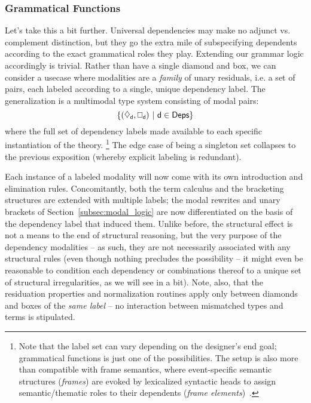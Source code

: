 \subsubsection{Grammatical Functions}
Let's take this a bit further.
Universal dependencies may make no adjunct vs. complement distinction, but they go the extra mile of subspecifying dependents according to the exact grammatical roles they play.
Extending our grammar logic accordingly is trivial.
Rather than have a single diamond and box, we can consider a usecase where modalities are a \textit{family} of unary residuals, i.e. a set of pairs, each labeled according to a single, unique dependency label.
The generalization is a multimodal type system consisting of modal pairs:
\begin{equation}
\{(\ddia{d}, \dbox{d}) \ | \ {\dep{d} \in \deps} \} 
\end{equation}
where \deps{} the full set of dependency labels made available to each specific instantiation of the theory.%
\footnote{Note that the label set can vary depending on the designer's end goal; grammatical functions is just one of the possibilities.
	The setup is also more than compatible with frame semantics, where event-specific semantic structures (\textit{frames}) are evoked by lexicalized syntactic heads to assign semantic/thematic roles to their dependents (\textit{frame elements})~\cite{fillmore1976frame}.}%
The edge case of \deps{} being a singleton set collapses to the previous exposition (whereby explicit labeling is redundant).

Each instance of a labeled modality will now come with its own introduction and elimination rules.
Concomitantly, both the term calculus and the bracketing structures are extended with multiple labels; the modal rewrites and unary brackets of Section~\ref{subsec:modal_logic} are now differentiated on the basis of the dependency label that induced them.
Unlike before, the structural effect is not a means to the end of structural reasoning, but the very purpose of the dependency modalities -- as such, they are not necessarily associated with any structural rules (even though nothing precludes the possibility -- it might even be reasonable to condition each dependency or combinations thereof to a unique set of structural irregularities, as we will see in a bit).
Note, also, that the residuation properties and normalization routines apply only between diamonds and boxes of the \textit{same label} -- no interaction between mismatched types and terms is stipulated.


